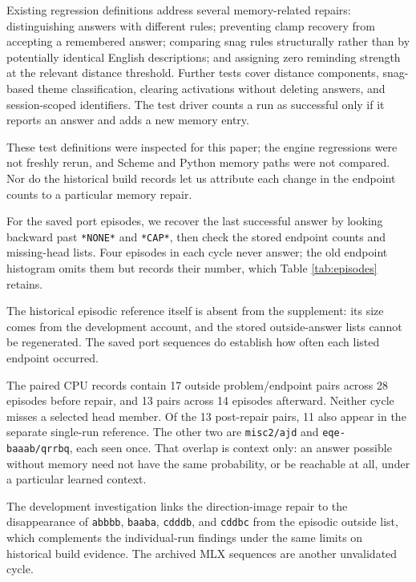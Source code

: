 \documentclass[10pt,letterpaper]{article}
\begin{document}
Existing regression definitions address several memory-related repairs: distinguishing
answers with different rules; preventing clamp recovery from accepting a remembered
answer; comparing snag rules structurally rather than by potentially identical English
descriptions; and assigning zero reminding strength at the relevant distance threshold.
Further tests cover distance components, snag-based theme classification, clearing
activations without deleting answers, and session-scoped identifiers. The test driver
counts a run as successful only if it reports an answer and adds a new memory entry.

These test definitions were inspected for this paper; the engine regressions were not
freshly rerun, and Scheme and Python memory paths were not compared. Nor do the historical
build records let us attribute each change in the endpoint counts to a particular memory
repair.

For the saved port episodes, we recover the last successful answer by looking backward
past \texttt{*NONE*} and \texttt{*CAP*}, then check the stored endpoint counts and
missing-head lists. Four episodes in each cycle never answer; the old endpoint histogram
omits them but records their number, which Table \ref{tab:episodes} retains.

The historical episodic reference itself is absent from the supplement: its size comes
from the development account, and the stored outside-answer lists cannot be regenerated.
The saved port sequences do establish how often each listed endpoint occurred.



The paired CPU records contain 17 outside problem/endpoint pairs across 28 episodes before
repair, and 13 pairs across 14 episodes afterward. Neither cycle misses a selected head
member. Of the 13 post-repair pairs, 11 also appear in the separate single-run reference.
The other two are \texttt{misc2/ajd} and \texttt{eqe-baaab/qrrbq}, each seen once. That
overlap is context only: an answer possible without memory need not have the same
probability, or be reachable at all, under a particular learned context.

The development investigation links the direction-image repair to the disappearance of
\texttt{abbbb}, \texttt{baaba}, \texttt{cdddb}, and \texttt{cddbc} from the episodic
outside list, which complements the individual-run findings under the same limits on
historical build evidence. The archived MLX sequences are another unvalidated cycle.
\end{document}
